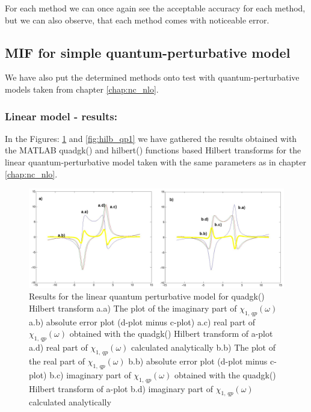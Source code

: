 \documentclass[12pt,twoside,a4paper]{article}
\numberwithin{equation}{subsection}
\numberwithin{figure}{subsection}
\begin{document}
For each method we can once again see the acceptable accuracy for each method, but we can also observe, that each method comes
with noticeable error.

\subsection{MIF for simple quantum-perturbative model} \label{chap:matlab_quantum}

We have also put the determined methods onto test with quantum-perturbative models taken from chapter \ref{chap:nc_nlo}.

\subsubsection*{Linear model - results:}

In the Figures: \ref{fig:quadgk_qp1} and \ref{fig:hilb_qp1} we have gathered the results ob\-tained with the MATLAB quadgk() and
hilbert() functions based Hil\-bert tran\-sforms for the linear qua\-ntum\--per\-tur\-ba\-tive model taken with the same para\-meters as in
chapter \ref{chap:nc_nlo}.

\begin{figure}
  \includegraphics[width=150mm]{img/quadgk_qp1.png}
  \caption{Results for the linear quantum perturbative model for quadgk() Hilbert transform
    a.a) The plot of the imaginary part of ${\chi_{1, \, qp}}(\omega )$
    a.b) absolute error plot (d-plot minus c-plot) 
    a.c) real part of ${\chi_{1, \, qp}}(\omega )$ obtained with the quadgk() Hilbert transform of a-plot 
    a.d) real part of ${\chi_{1, \, qp}}(\omega )$ calculated analytically 
    b.b) The plot of the real part of ${\chi_{1, \, qp}}(\omega )$ 
    b.b) absolute error plot (d-plot minus c-plot) 
    b.c) imaginary part of ${\chi_{1, \, qp}}(\omega )$ obtained with the quadgk()  Hilbert transform of a-plot 
    b.d) imaginary part of ${\chi_{1, \, qp}}(\omega )$ calculated analytically  
    \label{fig:quadgk_qp1}
  }
\end{figure}
\end{document}

